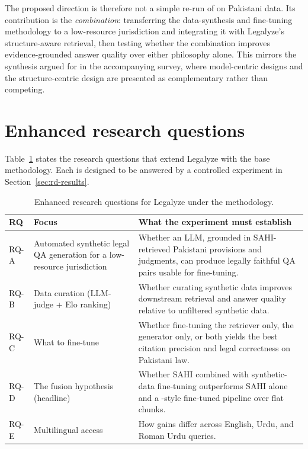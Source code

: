 \documentclass[10pt,twocolumn]{article}
\renewcommand{\arraystretch}{1.25}
\begin{document}
The proposed direction is therefore not a simple re-run of \citet{ren2026} on Pakistani data. Its
contribution is the \emph{combination}: transferring the data-synthesis and fine-tuning methodology to a
low-resource jurisdiction and integrating it with Legalyze's structure-aware retrieval, then testing
whether the combination improves evidence-grounded answer quality over either philosophy alone. This
mirrors the synthesis argued for in the accompanying survey, where model-centric designs
\citep{buffa2025, ren2026} and the structure-centric design \citep{hamza2026} are presented as
complementary rather than competing.

\section{Enhanced research questions}
\label{sec:rd-rqs}

Table~\ref{tab:rd-rq} states the research questions that extend Legalyze with the base methodology. Each
is designed to be answered by a controlled experiment in Section~\ref{sec:rd-results}.

\begin{table}[t]
\centering
\caption{Enhanced research questions for Legalyze under the \citet{ren2026} methodology.}
\label{tab:rd-rq}
\footnotesize
\setlength{\tabcolsep}{5pt}
\renewcommand{\arraystretch}{1.3}
\begin{tabularx}{\textwidth}{>{\raggedright\arraybackslash}p{1.4cm} >{\raggedright\arraybackslash}X >{\raggedright\arraybackslash}X}
\toprule
\textbf{RQ} & \textbf{Focus} & \textbf{What the experiment must establish} \\
\midrule
RQ-A & Automated synthetic legal QA generation for a low-resource jurisdiction & Whether an LLM, grounded in SAHI-retrieved Pakistani provisions and judgments, can produce legally faithful QA pairs usable for fine-tuning. \\
RQ-B & Data curation (LLM-judge + Elo ranking) & Whether curating synthetic data improves downstream retrieval and answer quality relative to unfiltered synthetic data. \\
RQ-C & What to fine-tune & Whether fine-tuning the retriever only, the generator only, or both yields the best citation precision and legal correctness on Pakistani law. \\
RQ-D & The fusion hypothesis (headline) & Whether SAHI combined with synthetic-data fine-tuning outperforms SAHI alone and a \citet{ren2026}-style fine-tuned pipeline over flat chunks. \\
RQ-E & Multilingual access & How gains differ across English, Urdu, and Roman Urdu queries. \\
\bottomrule
\end{tabularx}
\end{table}
\end{document}
